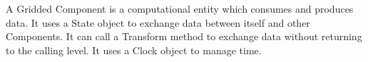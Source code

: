 %



A Gridded Component is a computational entity which
consumes and produces data.  It uses a State object to
exchange data between itself and other Components.
It can call a Transform method to exchange data
without returning to the calling level.  It uses
a Clock object to manage time.


